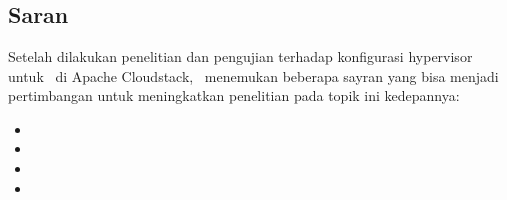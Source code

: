 \chapter{\babLima}

\section{Saran}
Setelah dilakukan penelitian dan pengujian terhadap konfigurasi hypervisor untuk \vm\ di Apache Cloudstack, \saya\ menemukan beberapa sayran yang bisa menjadi pertimbangan untuk meningkatkan penelitian pada topik ini kedepannya:

\begin{itemize}
  \item
  \item
  \item
  \item
\end{itemize}
